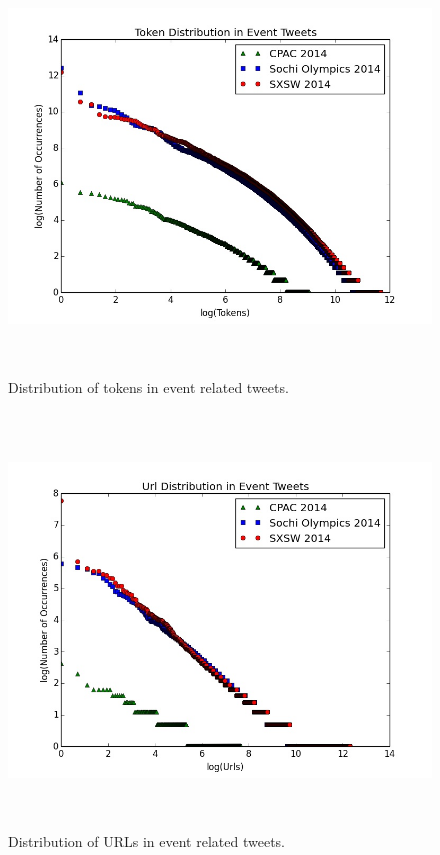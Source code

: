 \begin{figure}[htbp]
  \caption{Distribution of tokens in event related tweets.}
\label{tokendist}
  \centering
    \includegraphics[width=14cm,height=11cm]{Figures/TokenDistribution.jpeg}
\end{figure}

\begin{figure}[htbp]
  \caption{Distribution of URLs in event related tweets.}
\label{urldist}
  \centering
    \includegraphics[width=14cm,height=11cm]{Figures/UrlDistribution.jpeg}
\end{figure}

